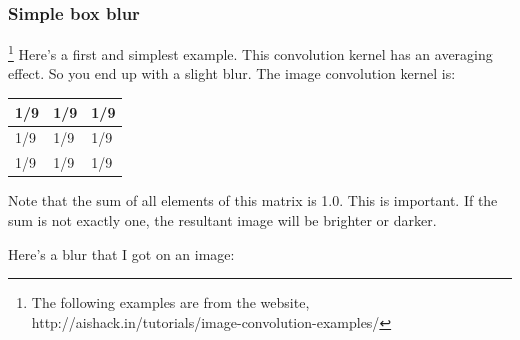 \subsubsection{Simple box blur}\footnote{The following examples are from the website, http://aishack.in/tutorials/image-convolution-examples/ }
Here's a first and simplest example. This convolution kernel has an averaging effect. So you end up with a slight blur. The image convolution kernel is:
\begin{table}[!htbp]
	\centering
	\begin{tabular}{|l|l|l|}
		\hline
		1/9 & 1/9 & 1/9 \\ \hline
		1/9 & 1/9 & 1/9 \\ \hline
		1/9 & 1/9 & 1/9 \\ \hline
	\end{tabular}
\end{table}

Note that the sum of all elements of this matrix is 1.0. This is important. If the sum is not exactly one, the resultant image will be brighter or darker.

Here's a blur that I got on an image:

\begin{figure}[H]
	\centering
\end{figure}

